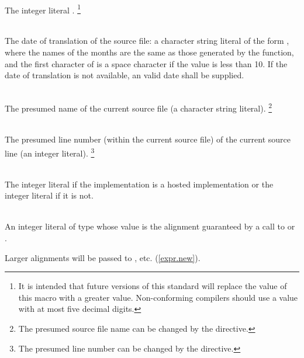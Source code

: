 \begin{description}

%
\item {}\\
The integer literal \tcode{\cppver}.
\footnote{It is intended that future
versions of this standard will
replace the value of this macro with a greater value.
Non-conforming compilers should use a value with at most
five decimal digits.}

%
\item {}\\
The date of translation of the source file:
a character string literal of the form
,
where the names of the months are the same as those generated
by the
function,
and the first character of
is a space character if the value is less than 10.
If the date of translation is not available,
an  valid date
shall be supplied.

%
\item {}\\
The presumed name of the current source file (a character string
literal).%
\footnote{The presumed source file name can be changed by the  directive.}

%
\item {}\\
The presumed line number (within the current source file) of the current source line
(an integer literal).%
\footnote{The presumed line number can be changed by the  directive.}

%
%
\item {}\\
The integer literal  if the implementation is a hosted
implementation or the integer literal  if it is not.

%
%
\item {}\\
An integer literal of type 
whose value is the alignment guaranteed
by a call to 
or .
\begin{note}
Larger alignments will be passed to
, etc. (\ref{expr.new}).
\end{note}


\end{description}
